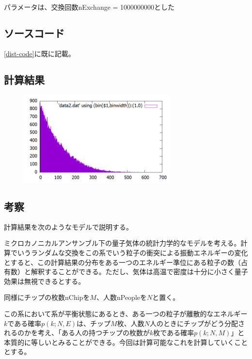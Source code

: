 \documentclass[ %
  platex,%
  papersize,%
  twocolumn,
  landscape
]{jsarticle}
\begin{document}
パラメータは、交換回数nExchange = 1000000000とした\\

\subsection{ソースコード}
\ref{dist-code}に既に記載。

\subsection{計算結果}
\begin{figure}[H]
\begin{center}
\includegraphics[width=8cm]{../cpp/out/dice_game/data2.png}
\end{center}
\caption{}
\end{figure}

\subsection{考察}
計算結果を次のようなモデルで説明する。

ミクロカノニカルアンサンブル下の量子気体の統計力学的なモデルを考える。計算でいうランダムな交換をこの系でいう粒子の衝突による振動エネルギーの変化とすると、この計算結果の分布をある一つのエネルギー準位にある粒子の数（占有数）と解釈することができる。ただし、気体は高温で密度は十分に小さく量子効果は無視できるとする。

同様にチップの枚数nChipを$M$、人数nPeopleを$N$と置く。

この系において系が平衡状態にあるとき、ある一つの粒子が離散的なエネルギー$k$である確率$p(k;N,E)$は、チップ$M$枚、人数$N$人のときにチップがどう分配されるのかを考え、「ある人の持つチップの枚数が$k$枚である確率$p(k;N,M)$」と本質的に等しいとみることができる。今回は計算可能なこれを計算していくこととする。
\end{document}

